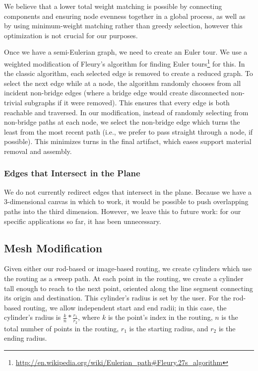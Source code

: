 We believe that a lower total weight matching is possible by connecting components and ensuring node evenness together in a global process, as well as by using minimum-weight matching rather than greedy selection, however this optimization is not crucial for our purposes.

Once we have a semi-Eulerian graph, we need to create an Euler tour.  We use a weighted modification of Fleury's algorithm for finding Euler tours\footnote{\url{http://en.wikipedia.org/wiki/Eulerian_path\#Fleury.27s_algorithm}} for this.  In the classic algorithm, each selected edge is removed to create a reduced graph.  To select the next edge while at a node, the algorithm randomly chooses from all incident non-bridge edges (where a bridge edge would create disconnected non-trivial subgraphs if it were removed).  This ensures that every edge is both reachable and traversed.  In our modification, instead of randomly selecting from non-bridge paths at each node, we select the non-bridge edge which turns the least from the most recent path (i.e., we prefer to pass straight through a node, if possible).  This minimizes turns in the final artifact, which eases support material removal and assembly.

\subsubsection{Edges that Intersect in the Plane}
We do not currently redirect edges that intersect in the plane.  Because we have a 3-dimensional canvas in which to work, it would be possible to push overlapping paths into the third dimension.  However, we leave this to future work: for our specific applications so far, it has been unnecessary.


\subsection{Mesh Modification}

Given either our rod-based or image-based routing, we create cylinders which use the routing as a sweep path.  At each point in the routing, we create a cylinder tall enough to reach to the next point, oriented along the line segment connecting its origin and destination.  This cylinder's radius is set by the user.  For the rod-based routing, we allow independent start and end radii; in this case, the cylinder's radius is $\frac{k}{n}*\frac{r_1}{r_2}$, where $k$ is the point's index in the routing, $n$ is the total number of points in the routing, $r_1$ is the starting radius, and $r_2$ is the ending radius.

